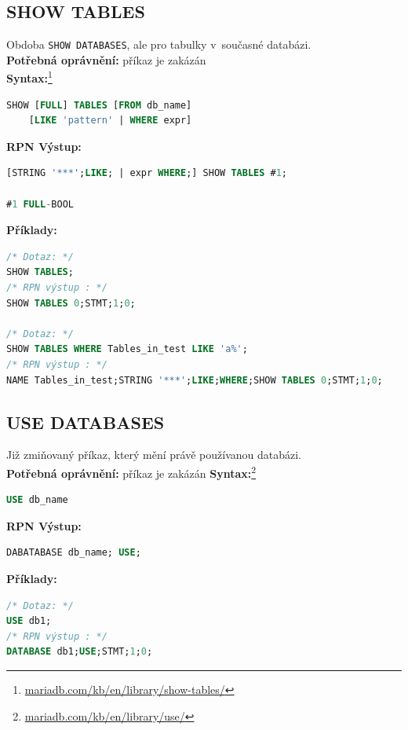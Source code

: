\subsection{SHOW TABLES} \label{subsec:6:showtbl}
Obdoba \texttt{SHOW DATABASES}, ale pro tabulky v~současné databázi. \\

\textbf{Potřebná oprávnění:} příkaz je zakázán \\

\textbf{Syntax:}\footnote{\url{mariadb.com/kb/en/library/show-tables/}}
\begin{lstlisting}[language=sql]
SHOW [FULL] TABLES [FROM db_name]
    [LIKE 'pattern' | WHERE expr]
\end{lstlisting}
\vspace*{\baselineskip}
\textbf{RPN Výstup:}
\begin{lstlisting}[language=sql]
[STRING '***';LIKE; | expr WHERE;] SHOW TABLES #1;

#1 FULL-BOOL
\end{lstlisting}
\vspace*{\baselineskip}
\textbf{Příklady:}
\begin{lstlisting}[language=sql]
/* Dotaz: */
SHOW TABLES;
/* RPN výstup : */
SHOW TABLES 0;STMT;1;0;

/* Dotaz: */
SHOW TABLES WHERE Tables_in_test LIKE 'a%';
/* RPN výstup : */
NAME Tables_in_test;STRING '***';LIKE;WHERE;SHOW TABLES 0;STMT;1;0;
\end{lstlisting}

\subsection{USE DATABASES} \label{subsec:6:usedb}
Již zmiňovaný příkaz, který mění právě používanou databázi. \\

\textbf{Potřebná oprávnění:} příkaz je zakázán 
\newpage
\textbf{Syntax:}\footnote{\url{mariadb.com/kb/en/library/use/}}
\begin{lstlisting}[language=sql]
USE db_name
\end{lstlisting}
\vspace*{\baselineskip}
\textbf{RPN Výstup:}
\begin{lstlisting}[language=sql]
DABATABASE db_name; USE;
\end{lstlisting}
\vspace*{\baselineskip}
\textbf{Příklady:}
\begin{lstlisting}[language=sql]
/* Dotaz: */
USE db1;
/* RPN výstup : */
DATABASE db1;USE;STMT;1;0;
\end{lstlisting}

